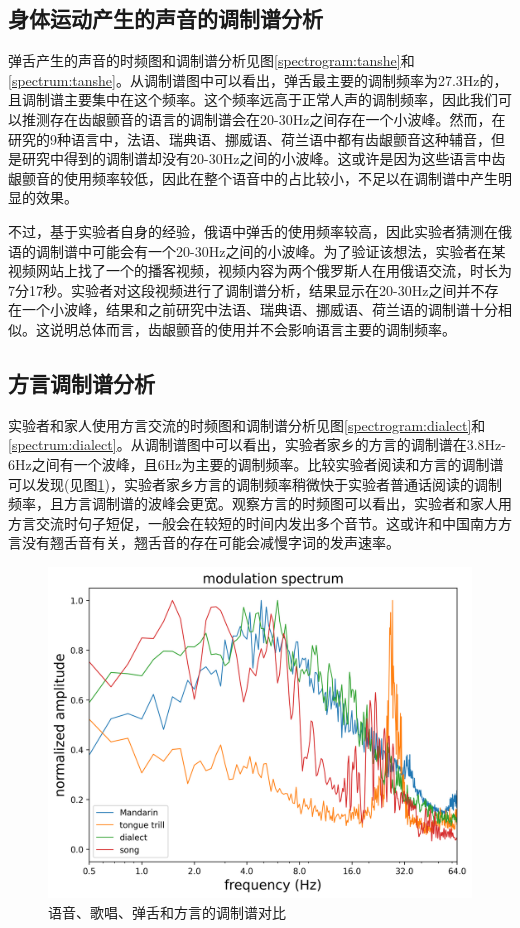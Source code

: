 \documentclass[jou,12pt,floatsintext]{apa7} %
\begin{document}
\subsection{\heiti 身体运动产生的声音的调制谱分析}

弹舌产生的声音的时频图和调制谱分析见图\ref{spectrogram:tanshe}和\ref{spectrum:tanshe}。从调制谱图中可以看出，弹舌最主要的调制频率为27.3Hz的，且调制谱主要集中在这个频率。这个频率远高于正常人声的调制频率，因此我们可以推测存在齿龈颤音的语言的调制谱会在20-30Hz之间存在一个小波峰。然而，在\textcite{ding2017temporal}研究的9种语言中，法语、瑞典语、挪威语、荷兰语中都有齿龈颤音这种辅音，但是研究中得到的调制谱却没有20-30Hz之间的小波峰。这或许是因为这些语言中齿龈颤音的使用频率较低，因此在整个语音中的占比较小，不足以在调制谱中产生明显的效果。

不过，基于实验者自身的经验，俄语中弹舌的使用频率较高，因此实验者猜测在俄语的调制谱中可能会有一个20-30Hz之间的小波峰。为了验证该想法，实验者在某视频网站上找了一个的播客视频，视频内容为两个俄罗斯人在用俄语交流，时长为7分17秒。实验者对这段视频进行了调制谱分析，结果显示在20-30Hz之间并不存在一个小波峰，结果和之前研究中法语、瑞典语、挪威语、荷兰语的调制谱十分相似。这说明总体而言，齿龈颤音的使用并不会影响语言主要的调制频率。


\subsection{\heiti 方言调制谱分析}

实验者和家人使用方言交流的时频图和调制谱分析见图\ref{spectrogram:dialect}和\ref{spectrum:dialect}。从调制谱图中可以看出，实验者家乡的方言的调制谱在3.8Hz-6Hz之间有一个波峰，且6Hz为主要的调制频率。比较实验者阅读和方言的调制谱可以发现(见图\ref{fig:four})，实验者家乡方言的调制频率稍微快于实验者普通话阅读的调制频率，且方言调制谱的波峰会更宽。观察方言的时频图可以看出，实验者和家人用方言交流时句子短促，一般会在较短的时间内发出多个音节。这或许和中国南方方言没有翘舌音有关，翘舌音的存在可能会减慢字词的发声速率。

\begin{figure}[H]
    \centering
    \includegraphics[width=\linewidth]{figure/spectrum_four.png}
    \captionsetup{labelsep=period}
    \caption{\small 语音、歌唱、弹舌和方言的调制谱对比}
    \label{fig:four}
\end{figure}
\end{document}
